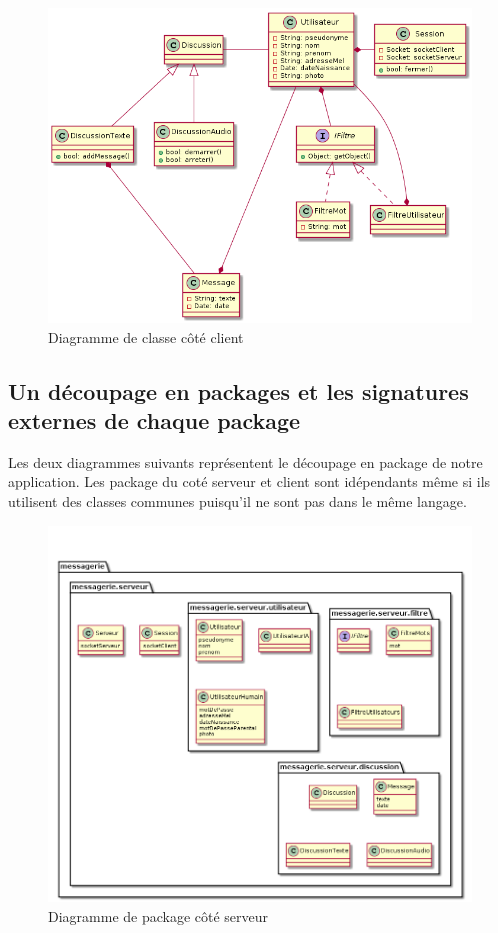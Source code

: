 \documentclass[a4paper,12pt]{article}
\begin{document}
	\begin{figure}[H]
		\centerline{\includegraphics[width=16.5cm]{../diagrammes/img/classesClient.png}}
		\caption{Diagramme de classe côté client}
	\end{figure}

	\subsection{Un découpage en packages et les signatures externes de chaque package}
	Les deux diagrammes suivants représentent le découpage en package de notre application.
	Les package du coté serveur et client sont idépendants même si ils utilisent des classes communes puisqu'il ne sont pas dans le même langage.
	\begin{figure}[H]
		\centerline{\includegraphics[width=16.5cm]{../diagrammes/img/packageServeur.png}}
		\caption{Diagramme de package côté serveur}
	\end{figure}
\end{document}
